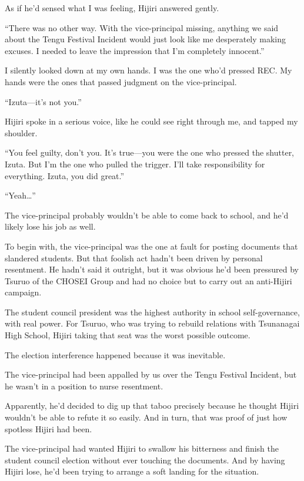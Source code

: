 \documentclass[
    a4paper,
    12pt,
    twoside,
    openany,
    UTF8,
    fontset=windows
]{ctexbook}
\begin{document}
As if he'd sensed what I was feeling, Hijiri answered gently.

``There was no other way. With the vice-principal missing, anything we said about the Tengu Festival Incident would just look like me desperately making excuses. I needed to leave the impression that I'm completely innocent.''

I silently looked down at my own hands. I was the one who'd pressed REC. My hands were the ones that passed judgment on the vice-principal.

``Izuta---it's not you.''

Hijiri spoke in a serious voice, like he could see right through me, and tapped my shoulder.

``You feel guilty, don't you. It's true---you were the one who pressed the shutter, Izuta. But I'm the one who pulled the trigger. I'll take responsibility for everything. Izuta, you did great.''

``Yeah\dots''

The vice-principal probably wouldn't be able to come back to school, and he'd likely lose his job as well.

To begin with, the vice-principal was the one at fault for posting documents that slandered students. But that foolish act hadn't been driven by personal resentment. He hadn't said it outright, but it was obvious he'd been pressured by Tsuruo of the CHOSEI Group and had no choice but to carry out an anti-Hijiri campaign.

The student council president was the highest authority in school self-governance, with real power. For Tsuruo, who was trying to rebuild relations with Tsunanagai High School, Hijiri taking that seat was the worst possible outcome.

The election interference happened because it was inevitable.

The vice-principal had been appalled by us over the Tengu Festival Incident, but he wasn't in a position to nurse resentment.

Apparently, he'd decided to dig up that taboo precisely because he thought Hijiri wouldn't be able to refute it so easily. And in turn, that was proof of just how spotless Hijiri had been.

The vice-principal had wanted Hijiri to swallow his bitterness and finish the student council election without ever touching the documents. And by having Hijiri lose, he'd been trying to arrange a soft landing for the situation.
\end{document}
